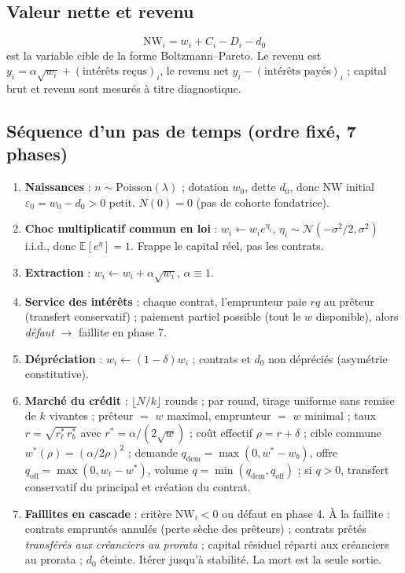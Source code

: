 \documentclass[11pt,a4paper]{article}
\newcommand{\NW}{\mathrm{NW}}
\newcommand{\E}{\mathbb{E}}
\begin{document}
\subsection{Valeur nette et revenu}
\begin{equation}
\NW_i = w_i + C_i - D_i - d_0
\end{equation}
est la variable cible de la forme Boltzmann--Pareto. Le revenu est
$y_i = \alpha\sqrt{w_i} + (\text{intérêts reçus})_i$, le revenu net
$y_i - (\text{intérêts payés})_i$ ; capital brut et revenu sont mesurés à
titre diagnostique.

\subsection{Séquence d'un pas de temps (ordre fixé, 7 phases)}
\begin{enumerate}[nosep]
\item \textbf{Naissances} : $n \sim \mathrm{Poisson}(\lambda)$ ; dotation
  $w_0$, dette $d_0$, donc $\NW$ initial $\varepsilon_0 = w_0 - d_0 > 0$
  petit. $N(0) = 0$ (pas de cohorte fondatrice).
\item \textbf{Choc multiplicatif commun en loi} :
  $w_i \leftarrow w_i e^{\eta_i}$, $\eta_i \sim
  \mathcal{N}(-\sigma^2/2, \sigma^2)$ i.i.d., donc $\E[e^\eta] = 1$. Frappe le
  capital réel, pas les contrats.
\item \textbf{Extraction} : $w_i \leftarrow w_i + \alpha\sqrt{w_i}$,
  $\alpha \equiv 1$.
\item \textbf{Service des intérêts} : chaque contrat, l'emprunteur paie $rq$
  au prêteur (transfert conservatif) ; paiement partiel possible (tout le $w$
  disponible), alors \emph{défaut} $\to$ faillite en phase 7.
\item \textbf{Dépréciation} : $w_i \leftarrow (1-\delta) w_i$ ; contrats et
  $d_0$ non dépréciés (asymétrie constitutive).
\item \textbf{Marché du crédit} : $\lfloor N/k \rfloor$ rounds ; par round,
  tirage uniforme sans remise de $k$ vivantes ; prêteur $=$ $w$ maximal,
  emprunteur $=$ $w$ minimal ; taux $r = \sqrt{r^*_\ell\, r^*_b}$ avec
  $r^* = \alpha/(2\sqrt{w})$ ; coût effectif $\rho = r + \delta$ ; cible
  commune $w^*(\rho) = (\alpha/2\rho)^2$ ; demande
  $q_{\mathrm{dem}} = \max(0, w^* - w_b)$, offre
  $q_{\mathrm{off}} = \max(0, w_\ell - w^*)$, volume
  $q = \min(q_{\mathrm{dem}}, q_{\mathrm{off}})$ ; si $q>0$, transfert
  conservatif du principal et création du contrat.
\item \textbf{Faillites en cascade} : critère $\NW_i < 0$ ou défaut en
  phase 4. À la faillite : contrats empruntés annulés (perte sèche des
  prêteurs) ; contrats prêtés \emph{transférés aux créanciers au prorata} ;
  capital résiduel réparti aux créanciers au prorata ; $d_0$ éteinte. Itérer
  jusqu'à stabilité. La mort est la seule sortie.
\end{enumerate}
\end{document}
